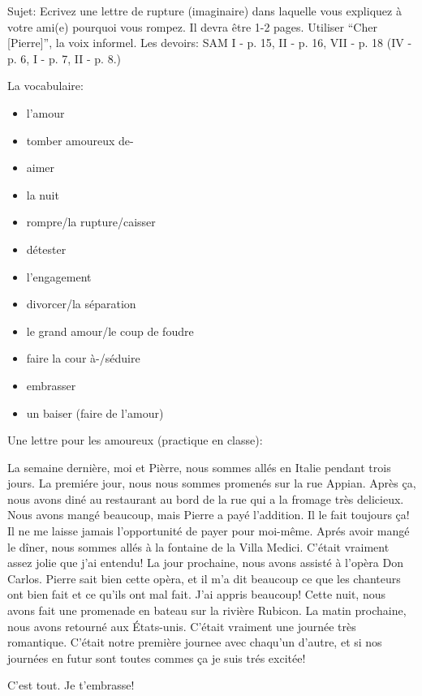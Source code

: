 \documentclass{report}
\begin{document}
Sujet: Ecrivez une lettre de rupture (imaginaire) dans laquelle vous expliquez \`a votre ami(e) pourquoi vous rompez. Il devra \^etre 1-2 pages. Utiliser "`Cher [Pierre]"', la voix informel. Les devoirs: SAM I - p. 15, II - p. 16, VII - p. 18 (IV - p. 6, I - p. 7, II - p. 8.)

La vocabulaire:

\begin{itemize}
\setlength{\itemsep}{0pt}
\setlength{\parskip}{0pt}
\setlength{\parsep}{0pt}
\item l'amour
\item tomber amoureux de-
\item aimer\item la nuit
\item rompre/la rupture/caisser
\item d\'etester
\item l'engagement
\item divorcer/la s\'eparation
\item le grand amour/le coup de foudre
\item faire la cour \`a-/s\'eduire
\item embrasser
\item un baiser (faire de l'amour)
\end{itemize}

Une lettre pour les amoureux (practique en classe):

La semaine derni\`ere, moi et Pi\`erre, nous sommes all\'es en Italie pendant trois jours. La premi\'ere jour, nous nous sommes promen\'es sur la rue Appian. Apr\`es \c{c}a, nous avons din\'e au restaurant au bord de la rue qui a la fromage tr\`es delicieux. Nous avons mang\'e beaucoup, mais Pierre a pay\'e l'addition. Il le fait toujours \c{c}a! Il ne me laisse jamais l'opportunit\'e de payer pour moi-m\^eme. Apr\'es avoir mang\'e le d\^iner, nous sommes all\'es \`a la fontaine de la Villa Medici. C'\'etait vraiment assez jolie que j'ai entendu! La jour prochaine, nous avons assist\'e \`a l'op\`era Don Carlos. Pierre sait bien cette op\`era, et il m'a dit beaucoup ce que les chanteurs ont bien fait et ce qu'ils ont mal fait. J'ai appris beaucoup! Cette nuit, nous avons fait une promenade en bateau sur la rivi\`ere Rubicon. La matin prochaine, nous avons retourn\'e aux \'Etats-unis. C'\'etait vraiment une journ\'ee tr\`es romantique. C'\'etait notre premi\`ere journee avec chaqu'un d'autre, et si nos journ\'ees en futur sont toutes commes \c{c}a je suis tr\'es excit\'ee!

C'est tout. Je t'embrasse!
\end{document}

